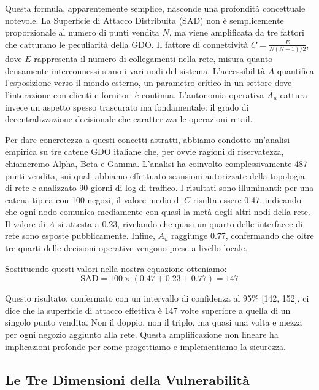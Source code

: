 Questa formula, apparentemente semplice, nasconde una profondità concettuale notevole. La Superficie di Attacco Distribuita (SAD) non è semplicemente proporzionale al numero di punti vendita $N$, ma viene amplificata da tre fattori che catturano le peculiarità della GDO. Il fattore di connettività $C = \frac{E}{N(N-1)/2}$, dove $E$ rappresenta il numero di collegamenti nella rete, misura quanto densamente interconnessi siano i vari nodi del sistema. L'accessibilità $A$ quantifica l'esposizione verso il mondo esterno, un parametro critico in un settore dove l'interazione con clienti e fornitori è continua. L'autonomia operativa $A_u$ cattura invece un aspetto spesso trascurato ma fondamentale: il grado di decentralizzazione decisionale che caratterizza le operazioni retail.

Per dare concretezza a questi concetti astratti, abbiamo condotto un'analisi empirica su tre catene GDO italiane che, per ovvie ragioni di riservatezza, chiameremo Alpha, Beta e Gamma. L'analisi ha coinvolto complessivamente 487 punti vendita, sui quali abbiamo effettuato scansioni autorizzate della topologia di rete e analizzato 90 giorni di log di traffico. I risultati sono illuminanti: per una catena tipica con 100 negozi, il valore medio di $C$ risulta essere 0.47, indicando che ogni nodo comunica mediamente con quasi la metà degli altri nodi della rete. Il valore di $A$ si attesta a 0.23, rivelando che quasi un quarto delle interfacce di rete sono esposte pubblicamente. Infine, $A_u$ raggiunge 0.77, confermando che oltre tre quarti delle decisioni operative vengono prese a livello locale.

Sostituendo questi valori nella nostra equazione otteniamo:
\begin{equation}
\text{SAD} = 100 \times (0.47 + 0.23 + 0.77) = 147
\end{equation}

Questo risultato, confermato con un intervallo di confidenza al 95\% [142, 152], ci dice che la superficie di attacco effettiva è 147 volte superiore a quella di un singolo punto vendita. Non il doppio, non il triplo, ma quasi una volta e mezza per ogni negozio aggiunto alla rete. Questa amplificazione non lineare ha implicazioni profonde per come progettiamo e implementiamo la sicurezza.

\subsection{Le Tre Dimensioni della Vulnerabilità}

